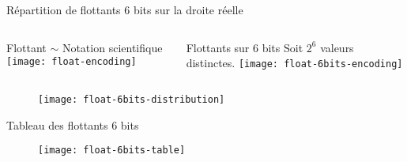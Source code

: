 \documentclass[10pt]{beamer}
\begin{document}
 \questionSlide

 \appendix
 \backupSlides


\begin{frame}{Répartition de flottants 6 bits sur la droite réelle}

\begin{columns}[t]
  \begin{column}{0.48\textwidth}
    \begin{block}{Flottant $\sim$ Notation scientifique}
      \texttt{[image: float-encoding]}
    \end{block}
  \end{column}
  \begin{column}{0.48\textwidth}
    \begin{block}{Flottants sur 6 bits}
      Soit $2^6$ valeurs distinctes.
      \texttt{[image: float-6bits-encoding]}
    \end{block}
  \end{column}
\end{columns}

\begin{figure}[b]
  \centering
  \texttt{[image: float-6bits-distribution]}
\end{figure}

\end{frame}

\begin{frame}{Tableau des flottants 6 bits}
  \begin{figure}[htbp]
    \centering
    \texttt{[image: float-6bits-table]}
  \end{figure}
\end{frame}
\end{document}
